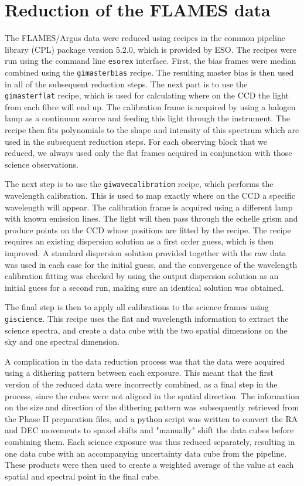 \documentclass[a4wide,12pt]{book}
\begin{document}
{\section{Reduction of the FLAMES data}

The FLAMES/Argus data were reduced using recipes in the common pipeline library (CPL) package version 5.2.0, which is provided by ESO. The recipes were run using the command line \texttt{esorex} interface. First, the bias frames were median combined using the \texttt{gimasterbias} recipe. The resulting master bias is then used in all of the subsequent reduction steps. The next part is to use the \texttt{gimasterflat} recipe, which is used for calculating where on the CCD the light from each fibre will end up. The calibration frame is acquired by using a halogen lamp as a continuum source and feeding this light through the instrument. The recipe then fits polynomials to the shape and intensity of this spectrum which are used in the subsequent reduction steps. For each observing block that we reduced, we always used only the flat frames acquired in conjunction with those science observations. 

The next step is to use the \texttt{giwavecalibration} recipe, which performs the wavelength calibration. This is used to map exactly where on the CCD a specific wavelength will appear. The calibration frame is acquired using a different lamp with known emission lines. The light will then pass through the echelle grism and produce points on the CCD whose positions are fitted by the recipe. The recipe requires an existing dispersion solution as a first order guess, which is then improved. A standard dispersion solution provided together with the raw data was used in each case for the initial guess, and the convergence of the wavelength calibration fitting was checked by using the output dispersion solution as an initial guess for a second run, making sure an identical solution was obtained. 

The final step is then to apply all calibrations to the science frames using \texttt{giscience}. This recipe uses the flat and wavelength information to extract the science spectra, and create a data cube with the two spatial dimensions on the sky and one spectral dimension. 

A complication in the data reduction process was that the data were acquired using a dithering pattern between each exposure. This meant that the first version of the reduced data were incorrectly combined, as a final step in the process, since the cubes were not aligned in the spatial direction. 
The information on the size and direction of the dithering pattern was subsequently retrieved from the Phase II preparation files, and a python script was written to convert the RA and DEC movements to spaxel shifts and "manually" shift the data cubes before combining them. Each science exposure was thus reduced separately, resulting in one data cube with an accompanying uncertainty data cube from the pipeline. These products were then used to create a weighted average of the value at each spatial and spectral point in the final cube. 

}
\end{document}
